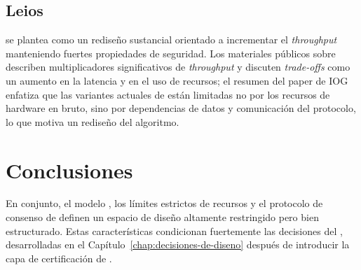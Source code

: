 \subsection{Leios}
\label{subsec:motivation-leios}

\Leios se plantea como un rediseño sustancial orientado a incrementar el \textit{throughput} manteniendo fuertes propiedades de seguridad. Los materiales públicos sobre \Leios describen multiplicadores significativos de \textit{throughput} y discuten \textit{trade-offs} como un aumento en la latencia y en el uso de recursos; el resumen del paper de IOG enfatiza que las variantes actuales de \Ouroboros están limitadas no por los recursos de hardware en bruto, sino por dependencias de datos y comunicación del protocolo, lo que motiva un rediseño del algoritmo.

\section{Conclusiones}
\label{sec:motivation-conclusiones}

En conjunto, el modelo \eUTxO, los límites estrictos de recursos y el protocolo de consenso de \Cardano definen un espacio de diseño altamente restringido pero bien estructurado. Estas características condicionan fuertemente las decisiones del \zkBridge, desarrolladas en el Capítulo~\ref{chap:decisiones-de-diseno} después de introducir la capa de certificación de \Mithril.
